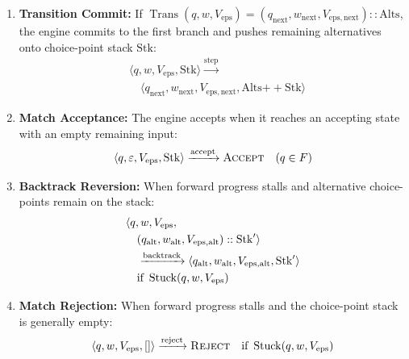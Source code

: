\documentclass{ieeeaccess}
\begin{document}
\begin{enumerate}
    \item \textbf{Transition Commit:} If $\operatorname{Trans}(q, w, V_{\mathrm{eps}}) = (q_{\mathrm{next}}, w_{\mathrm{next}}, V_{\mathrm{eps,next}}) :: \mathrm{Alts}$, the engine commits to the first branch and pushes remaining alternatives onto choice-point stack $\mathrm{Stk}$:
    \begin{equation}\label{eq:rule_commit}
    \begin{aligned}
    &\langle q, w, V_{\mathrm{eps}}, \mathrm{Stk} \rangle \xrightarrow{\mathrm{step}} \\
    &\quad \langle q_{\mathrm{next}}, w_{\mathrm{next}}, V_{\mathrm{eps,next}}, \mathrm{Alts} \mathbin{+\!\!+} \mathrm{Stk} \rangle
    \end{aligned}
    \end{equation}
    \item \textbf{Match Acceptance:} The engine accepts when it reaches an accepting state with an empty remaining input:
    \begin{equation}\label{eq:rule_accept}
    \langle q, \varepsilon, V_{\mathrm{eps}}, \mathrm{Stk} \rangle \xrightarrow{\mathrm{accept}} \textsc{Accept} \quad (q \in F)
    \end{equation}
    \item \textbf{Backtrack Reversion:} When forward progress stalls and alternative choice-points remain on the stack:
    \begin{align}\label{eq:rule_backtrack}
    &\langle q, w, V_{\mathrm{eps}}, \notag \\
    &\quad (q_{\mathrm{alt}}, w_{\mathrm{alt}}, V_{\mathrm{eps,alt}}) :: \mathrm{Stk}' \rangle \notag \\
    &\quad \xrightarrow{\mathrm{backtrack}} \langle q_{\mathrm{alt}}, w_{\mathrm{alt}}, V_{\mathrm{eps,alt}}, \mathrm{Stk}' \rangle \notag \\
    &\quad \text{if } \operatorname{Stuck}(q, w, V_{\mathrm{eps}})
    \end{align}
    \item \textbf{Match Rejection:} When forward progress stalls and the choice-point stack is generally empty:
    \begin{equation}\label{eq:rule_reject}
    \langle q, w, V_{\mathrm{eps}}, [] \rangle \xrightarrow{\mathrm{reject}} \textsc{Reject} \quad \text{if } \operatorname{Stuck}(q, w, V_{\mathrm{eps}})
    \end{equation}
\end{enumerate}
\end{document}
